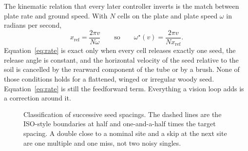 The kinematic relation that every later controller inverts is the match between plate rate and ground speed. With \(N\) cells on the plate and plate speed \(\omega\) in radians per second,
\begin{equation}
\label{eq:rate}
x_{\mathrm{ref}} = \frac{2\pi v}{N\omega}
\qquad\text{so}\qquad
\omega^{\star}(v) = \frac{2\pi v}{N x_{\mathrm{ref}}}.
\end{equation}
Equation~\eqref{eq:rate} is exact only when every cell releases exactly one seed, the release angle is constant, and the horizontal velocity of the seed relative to the soil is cancelled by the rearward component of the tube or by a brush. None of those conditions holds for a flattened, winged or irregular woody seed. Equation~\eqref{eq:rate} is still the feedforward term. Everything a vision loop adds is a correction around it.

\begin{figure}[ht]
\centering
{}
\caption{Classification of successive seed spacings. The dashed lines are the ISO-style boundaries at half and one-and-a-half times the target spacing. A double close to a nominal site and a skip at the next site are one multiple and one miss, not two noisy singles.}
\label{fig:classes}
\end{figure}

